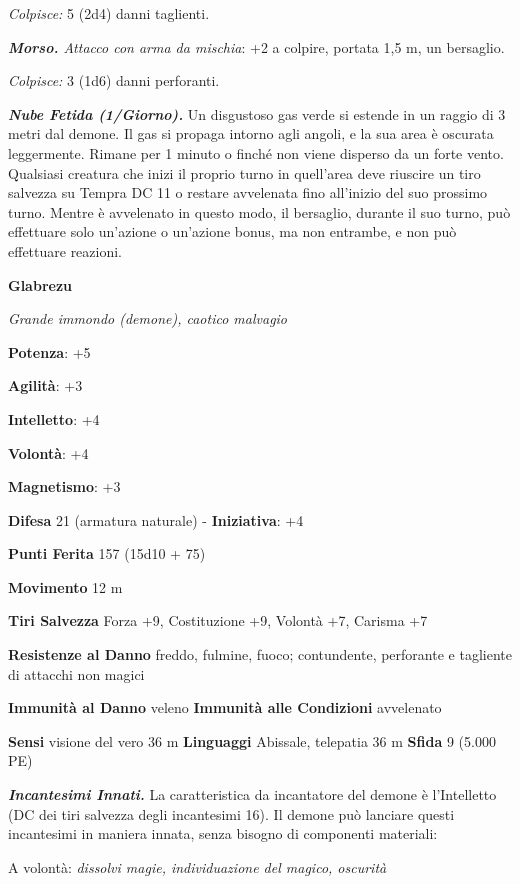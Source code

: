 \begin{multicols}{2}
\emph{Colpisce:} 5 (2d4) danni taglienti.

\emph{\textbf{Morso.} Attacco con arma da mischia}: +2 a colpire,
portata 1,5 m, un bersaglio.

\emph{Colpisce:} 3 (1d6) danni perforanti.

\emph{\textbf{Nube Fetida (1/Giorno).}} Un disgustoso gas verde si
estende in un raggio di 3 metri dal demone. Il gas si propaga intorno
agli angoli, e la sua area è oscurata leggermente. Rimane per 1 minuto o
finché non viene disperso da un forte vento. Qualsiasi creatura che
inizi il proprio turno in quell'area deve riuscire un tiro salvezza su Tempra DC 11 o restare avvelenata fino all'inizio del suo prossimo
turno. Mentre è avvelenato in questo modo, il bersaglio, durante il suo
turno, può effettuare solo un'azione o un'azione bonus, ma non entrambe,
e non può effettuare reazioni.



\textbf{Glabrezu}

\emph{Grande immondo (demone), caotico malvagio}

\textbf{Potenza}: +5

\textbf{Agilità}: +3

\textbf{Intelletto}: +4

\textbf{Volontà}: +4

\textbf{Magnetismo}: +3

\textbf{Difesa} 21 (armatura naturale) - \textbf{Iniziativa}: +4

\textbf{Punti Ferita} 157 (15d10 + 75)

\textbf{Movimento} 12 m

\textbf{Tiri Salvezza} Forza +9, Costituzione +9, Volontà +7, Carisma
+7

\textbf{Resistenze al Danno} freddo, fulmine, fuoco; contundente,
perforante e tagliente di attacchi non magici

\textbf{Immunità al Danno} veleno \textbf{Immunità alle Condizioni}
avvelenato

\textbf{Sensi} visione del vero 36 m
\textbf{Linguaggi} Abissale, telepatia 36 m \textbf{Sfida} 9 (5.000 PE)

\emph{\textbf{Incantesimi Innati.}} La caratteristica da incantatore del
demone è l'Intelletto (DC dei tiri salvezza degli incantesimi 16). Il
demone può lanciare questi incantesimi in maniera innata, senza bisogno
di componenti materiali:

A volontà: \emph{dissolvi magie, individuazione del magico, oscurità}


\end{multicols}
